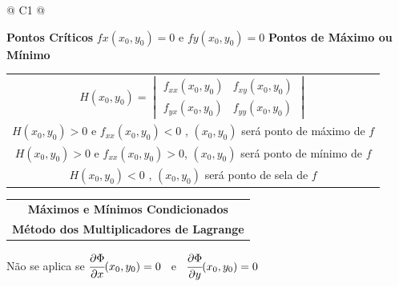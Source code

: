 		\begin{longtable}{
		@{}
		C{1\textwidth} 
		@{}}

			\toprule
			\textbf{Pontos Críticos}
			\tabularnewline
			\midrule
			{\large $fx(x_{0}, y_{0}) = 0$ e $fy(x_{0}, y_{0}) = 0$}
			\tabularnewline
			\midrule
			\textbf{Pontos de Máximo ou Mínimo}
			\tabularnewline
			\midrule
			{\large \begin{tabular}[c]{@{}c@{}}

				$
				H(x_{0}, y_{0}) =
				\begin{vmatrix}

					f_{xx}(x_{0}, y_{0}) & f_{xy}(x_{0}, y_{0}) \\
					f_{yx}(x_{0}, y_{0}) & f_{yy}(x_{0}, y_{0})
					\end{vmatrix}
				$ \\

				$H(x_{0}, y_{0}) > 0$ e $f_{xx}(x_{0}, y_{0}) < 0$ , $(x_{0}, y_{0})$ será ponto de máximo de $f$ \\

				$H(x_{0}, y_{0}) > 0$ e $f_{xx}(x_{0}, y_{0}) > 0$, $(x_{0}, y_{0})$ será ponto de mínimo de $f$ \\

				$H(x_{0}, y_{0}) < 0$ , $(x_{0}, y_{0})$ será ponto de sela de $f$

			\end{tabular}}
			\tabularnewline
			\midrule
			{\large \begin{tabular}[c]{@{}c@{}}

				\textbf{Máximos e Mínimos Condicionados} \\

				\textbf{Método dos Multiplicadores de Lagrange}

			\end{tabular}}
			\tabularnewline
			\midrule
			{\large Não se aplica se \hspace{1cm} $\cfrac{\partial \Phi}{\partial x} (x_{0}, y_{0}) = 0$ \ e \ $\cfrac{\partial \Phi}{\partial y} (x_{0}, y_{0}) = 0$}
			\tabularnewline
			\midrule
			{\large \begin{tabular}[c]{@{}c@{}}


\end{tabular}}
\end{longtable}
